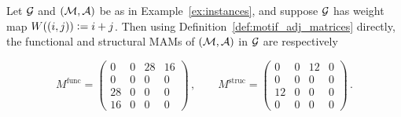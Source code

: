 \begin{example} \label{ex:motif_adj_matrices}
Let $\mathcal{G}$ and $\mathcal{(M,A)}$ be as in Example~\ref{ex:instances}, and suppose $\mathcal{G}$ has weight map $W((i,j)) \vcentcolon = i + j$. Then using Definition~\ref{def:motif_adj_matrices} directly, the functional and structural MAMs of $\mathcal{(M,A)}$ in $\mathcal{G}$ are respectively

\vspace*{0.2cm}
$$ %
	M^\mathrm{func} = \begin{pmatrix}
		0  & 0  & 28 & 16 \\
		0  & 0  & 0  & 0  \\
		28 & 0  & 0  & 0  \\
		16 & 0  & 0  & 0
	\end{pmatrix} \,,
	\qquad
	M^\mathrm{struc} = \begin{pmatrix}
		0  & 0  & 12 & 0  \\
		0  & 0  & 0  & 0  \\
		12 & 0  & 0  & 0  \\
		0  & 0  & 0  & 0
	\end{pmatrix}\,.
$$
\end{example}










\pagebreak

